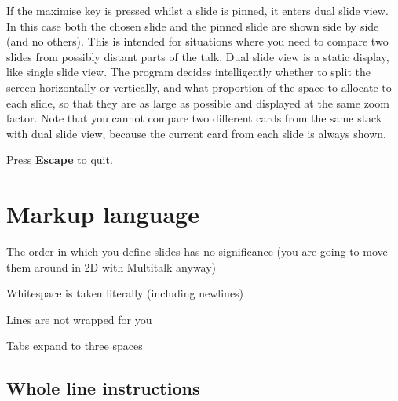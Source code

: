 \documentclass[12pt,a4paper,twoside]{article}
\renewcommand{\_}{\texttt{\symbol{95}}}
\begin{document}
If the maximise key is pressed whilst a slide is pinned, it enters
dual slide view. In this case both the
chosen slide and the pinned slide are shown side by side (and no
others). This is intended for situations where you need to compare
two slides from possibly distant parts of the talk. Dual slide view
is a static display, like single slide view.
The program decides intelligently whether to split the screen
horizontally or vertically, and what proportion of the space to
allocate to each slide, so that they are as large as possible and
displayed at the same zoom factor.
Note that you cannot compare two different cards from the same stack
with dual slide view, because the current card from each slide is
always shown.

Press \textbf{Escape} to quit.

\section{Markup language}

\begin{bulletlist}
\item The order in which you define slides has no significance
  (you are going to move them around in 2D with Multitalk anyway)
\item Whitespace is taken literally (including newlines)
\item Lines are not wrapped for you
\item Tabs expand to three spaces
\end{bulletlist}

\subsection*{Whole line instructions}
\end{document}

